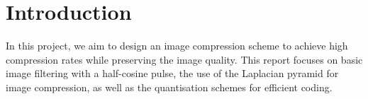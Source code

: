 \section*{Introduction} \label{sec:introduction}

In this project, we aim to design an image compression scheme to achieve high compression rates while preserving the image quality. This report focuses on basic image filtering with a half-cosine pulse, the use of the Laplacian pyramid for image compression, as well as the quantisation schemes for efficient coding.


